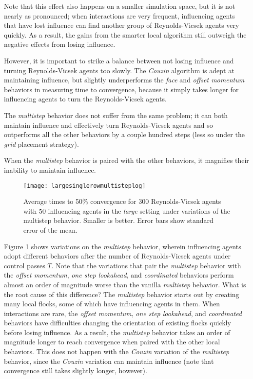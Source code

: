 Note that this effect also happens on a smaller simulation space, but it is
not nearly as pronounced; when interactions are very frequent, influencing
agents that have lost influence can find another group of Reynolds-Vicsek
agents very quickly.
As a result, the gains from the smarter local algorithm still outweigh the
negative effects from losing influence.

However, it is important to strike a balance between not losing influence and
turning Reynolds-Vicsek agents too slowly.
The \textit{Couzin} algorithm is adept at maintaining influence, but slightly
underperforms the \textit{face} and \textit{offset momentum} behaviors in
measuring time to convergence, because it simply takes longer for influencing
agents to turn the Reynolds-Vicsek agents.

The \textit{multistep} behavior does not suffer from the same problem; it
can both maintain influence and effectively turn Reynolds-Vicsek agents and so
outperforms all the other behaviors by a couple hundred steps (less so under
the \textit{grid} placement strategy).

When the \textit{multistep} behavior is paired with the other behaviors,
it magnifies their inability to maintain influence.
\begin{figure}
    \texttt{[image: largesinglerowmultisteplog]}
    \caption{Average times to 50\% convergence for $300$ Reynolds-Vicsek agents
    with $50$ influencing agents in the \textit{large} setting under variations
    of the multistep behavior.
    Smaller is better.
    Error bars show standard error of the mean.}
    \label{fig:largemultistep}
\end{figure}
Figure \ref{fig:largemultistep} shows variations on the \textit{multistep}
behavior, wherein influencing agents adopt different behaviors after the number
of Reynolds-Vicsek agents under control passes $T$.
Note that the variations that pair the \textit{multistep} behavior with the
\textit{offset momentum}, \textit{one step lookahead}, and \textit{coordinated}
behaviors perform almost an order of magnitude worse than the vanilla
\textit{multistep} behavior.
What is the root cause of this difference?
The \textit{multistep} behavior starts out by creating many local flocks, some
of which have influencing agents in them.
When interactions are rare, the \textit{offset momentum}, \textit{one step
lookahead}, and \textit{coordinated} behaviors have difficulties changing the
orientation of existing flocks quickly before losing influence.
As a result, the \textit{multistep} behavior takes an order of magnitude longer
to reach convergence when paired with the other local behaviors.
This does not happen with the \textit{Couzin} variation of the
\textit{multistep} behavior, since the \textit{Couzin} variation can maintain
influence (note that convergence still takes slightly longer, however).

